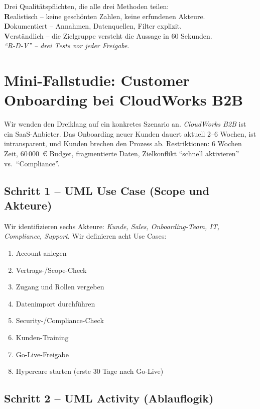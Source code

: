 \documentclass[11pt,a4paper,oneside]{article}
\newcommand{\caveatfontfallback}{\itshape}
\newcommand\caveatfont{\caveatfontfallback}%
\newcommand{\akzent}[1]{{\caveatfont\color{lpAmber}#1}}
\begin{document}
\begin{eselsbox}[Eselsbrücke: \akzent{R-D-V}]
Drei Qualitätspflichten, die alle drei Methoden teilen:\\[2pt]
\textbf{R}ealistisch -- keine geschönten Zahlen, keine erfundenen Akteure.\\
\textbf{D}okumentiert -- Annahmen, Datenquellen, Filter explizit.\\
\textbf{V}erständlich -- die Zielgruppe versteht die Aussage in 60 Sekunden.\\[2pt]
\emph{``R-D-V'' -- drei Tests vor jeder Freigabe.}
\end{eselsbox}

\section{Mini-Fallstudie: Customer Onboarding bei CloudWorks B2B}

Wir wenden den Dreiklang auf ein konkretes Szenario an. \emph{CloudWorks B2B} ist ein SaaS-Anbieter. Das Onboarding neuer Kunden dauert aktuell 2--6 Wochen, ist intransparent, und Kunden brechen den Prozess ab. Restriktionen: 6 Wochen Zeit, 60\,000~\euro{} Budget, fragmentierte Daten, Zielkonflikt ``schnell aktivieren'' vs.\ ``Compliance''.

\subsection{Schritt 1 -- UML Use Case (Scope und Akteure)}

Wir identifizieren sechs Akteure: \emph{Kunde, Sales, Onboarding-Team, IT, Compliance, Support}. Wir definieren acht Use Cases:

\begin{enumerate}
  \item Account anlegen
  \item Vertrags-/Scope-Check
  \item Zugang und Rollen vergeben
  \item Datenimport durchführen
  \item Security-/Compliance-Check
  \item Kunden-Training
  \item Go-Live-Freigabe
  \item Hypercare starten (erste 30 Tage nach Go-Live)
\end{enumerate}

\subsection{Schritt 2 -- UML Activity (Ablauflogik)}
\end{document}
